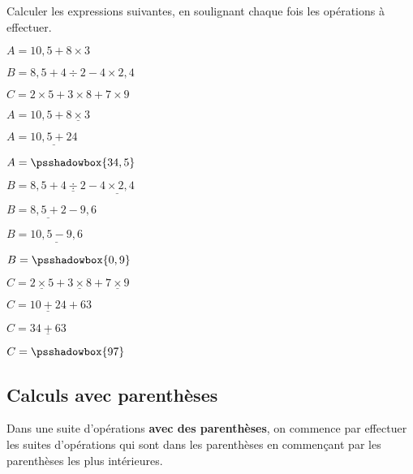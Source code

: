 \begin{exemple}[0.35]
   Calculer les expressions suivantes, en soulignant chaque fois les opérations à effectuer.
   
   $A=10,5+8\times 3$
   
   $B=8,5+4\div 2-4\times 2,4$
   
   $C=2\times 5+3\times 8+7\times 9$
   \correction

   \smallskip
   \begin{minipage}{0.54\linewidth}
      \begin{list}{}{}
         \item $A=10,5+\underline{8\times 3}$
         \item $A=\underline{10,5+24}$
         \item $A=\psshadowbox{34,5}$               
      \end{list}
   \end{minipage}      
   \begin{minipage}{0.44\linewidth}
      \begin{list}{}{}
         \item $B=8,5+\underline{4\div 2}-\underline{4\times 2,4}$
         \item $B=\underline{8,5+2}-9,6$
         \item $B=\underline{10,5-9,6}$
         \item $B=\psshadowbox{0,9}$         
      \end{list}
   \end{minipage}
   \begin{minipage}{0.5\linewidth}
      \begin{list}{}{}
         \item $C=\underline{2\times 5}+\underline{3\times 8}+\underline{7\times 9}$
         \item $C=\underline{10+24}+63$
         \item $C=\underline{34+63}$
         \item $C=\psshadowbox{97}$         
      \end{list}
   \end{minipage}   
\end{exemple}

\pagebreak
\subsection{Calculs avec parenthèses}

\begin{propriete}[\admise]
   Dans une suite d'opérations \textbf{avec des parenthèses}, on commence par effectuer les suites d'opérations qui sont dans les parenthèses en commençant par les parenthèses les plus intérieures.
\end{propriete}

